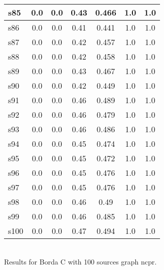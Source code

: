 \documentclass{article}
\begin{document}
\begin{tabular}{|l|c|c|c|c|c|c|}
\hline
s85 &0.0 & 0.0 & 0.43 & 0.466 & 1.0 & 1.0\\
\hline
s86 &0.0 & 0.0 & 0.41 & 0.441 & 1.0 & 1.0\\
\hline
s87 &0.0 & 0.0 & 0.42 & 0.457 & 1.0 & 1.0\\
\hline
s88 &0.0 & 0.0 & 0.42 & 0.458 & 1.0 & 1.0\\
\hline
s89 &0.0 & 0.0 & 0.43 & 0.467 & 1.0 & 1.0\\
\hline
s90 &0.0 & 0.0 & 0.42 & 0.449 & 1.0 & 1.0\\
\hline
s91 &0.0 & 0.0 & 0.46 & 0.489 & 1.0 & 1.0\\
\hline
s92 &0.0 & 0.0 & 0.46 & 0.479 & 1.0 & 1.0\\
\hline
s93 &0.0 & 0.0 & 0.46 & 0.486 & 1.0 & 1.0\\
\hline
s94 &0.0 & 0.0 & 0.45 & 0.474 & 1.0 & 1.0\\
\hline
s95 &0.0 & 0.0 & 0.45 & 0.472 & 1.0 & 1.0\\
\hline
s96 &0.0 & 0.0 & 0.45 & 0.476 & 1.0 & 1.0\\
\hline
s97 &0.0 & 0.0 & 0.45 & 0.476 & 1.0 & 1.0\\
\hline
s98 &0.0 & 0.0 & 0.46 & 0.49 & 1.0 & 1.0\\
\hline
s99 &0.0 & 0.0 & 0.46 & 0.485 & 1.0 & 1.0\\
\hline
s100 &0.0 & 0.0 & 0.47 & 0.494 & 1.0 & 1.0\\
\hline
\end{tabular}\\

\noindent Results for Borda C with 100 sources graph ncpr.
\end{document}
